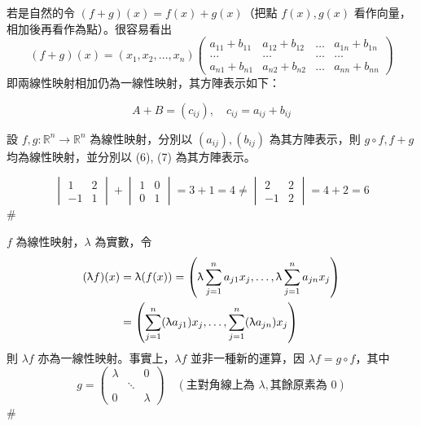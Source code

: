若是自然的令 $(f+g)(x) = f(x) + g(x)$（把點 $f(x), g(x)$ 看作向量，相加後再看作為點）。很容易看出
\[ (f+g)(x) = (x_1, x_2, \dots, x_n) \begin{pmatrix}
a_{11}+b_{11} & a_{12}+b_{12} & \dots & a_{1n}+b_{1n} \\
\dots & \dots & \dots & \dots \\
a_{n1}+b_{n1} & a_{n2}+b_{n2} & \dots & a_{nn}+b_{nn}
\end{pmatrix} \]
即兩線性映射相加仍為一線性映射，其方陣表示如下：

\begin{definition*}\label{def:b6-1-10}
\begin{equation}
A+B = (c_{ij}), \quad c_{ij} = a_{ij} + b_{ij} \label{eq:b6-1-7-7}
\end{equation}
\end{definition*}

\begin{theorem}\label{thm:b6-1-19}
設 $f, g: \mathbb{R}^n \longrightarrow \mathbb{R}^n$ 為線性映射，分別以 $(a_{ij}), (b_{ij})$ 為其方陣表示，則 $g \circ f, f+g$ 均為線性映射，並分別以 (6), (7) 為其方陣表示。
\end{theorem}

\begin{example}\label{ex:b6-1-36}
\[ \begin{vmatrix} 1 & 2 \\ -1 & 1 \end{vmatrix} + \begin{vmatrix} 1 & 0 \\ 0 & 1 \end{vmatrix} = 3 + 1 = 4 \ne \begin{vmatrix} 2 & 2 \\ -1 & 2 \end{vmatrix} = 4 + 2 = 6 \]\hfill$\#$
\end{example}

\begin{discussion}\label{disc:b6-1-3}
$f$ 為線性映射，$\lambda$ 為實數，令
\begin{align}
(\lambda f)(x) &= \lambda (f(x)) = \left(\lambda \sum_{j=1}^n a_{j1} x_j, \dots, \lambda \sum_{j=1}^n a_{jn} x_j\right) \notag \\
&= \left(\sum_{j=1}^n (\lambda a_{j1}) x_j, \dots, \sum_{j=1}^n (\lambda a_{jn}) x_j\right) \label{eq:b6-1-7-8}
\end{align}
則 $\lambda f$ 亦為一線性映射。事實上，$\lambda f$ 並非一種新的運算，因 $\lambda f = g \circ f$，其中
\[ g = \begin{pmatrix}
\lambda & & 0 \\
& \ddots & \\
0 & & \lambda
\end{pmatrix} \quad (\text{主對角線上為 } \lambda, \text{其餘原素為 } 0) \]\hfill$\#$
\end{discussion}

